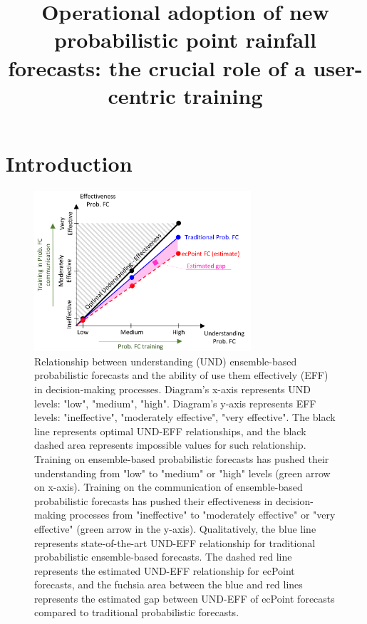 \documentclass[twocol]{ametsocV5} %
\title{Operational adoption of new probabilistic point rainfall forecasts: the crucial role of a user-centric training}
\affiliation{University of Reading, Reading, UK \\
European Centre for Medium-Range Weather Forecasts, Reading, UK}
\begin{document}
\maketitle


\section{Introduction}

\begin{figure}
\centerline{\includegraphics[width=19pc]{manuscript/Figures/ProbFC_Knowledge_Effectiveness_Estimate.png}}
\caption{Relationship between understanding (UND) ensemble-based probabilistic forecasts and the ability of use them effectively (EFF) in decision-making processes. Diagram's x-axis represents UND levels: "low", "medium", "high". Diagram's y-axis represents EFF levels: "ineffective", "moderately effective", "very effective". The black line represents optimal UND-EFF relationships, and the black dashed area represents impossible values for such relationship. Training on ensemble-based probabilistic forecasts has pushed their understanding from "low" to "medium" or "high" levels (green arrow on x-axis). Training on the communication of ensemble-based probabilistic forecasts has pushed their effectiveness in decision-making processes from "ineffective" to "moderately effective" or "very effective" (green arrow in the y-axis). Qualitatively, the blue line represents state-of-the-art UND-EFF relationship for traditional probabilistic ensemble-based forecasts. The dashed red line represents the estimated UND-EFF relationship for ecPoint forecasts, and the fuchsia area between the blue and red lines represents the estimated gap between UND-EFF of ecPoint forecasts compared to traditional probabilistic forecasts.}
\label{UND_EFF_estimated}
\end{figure}
\end{document}
